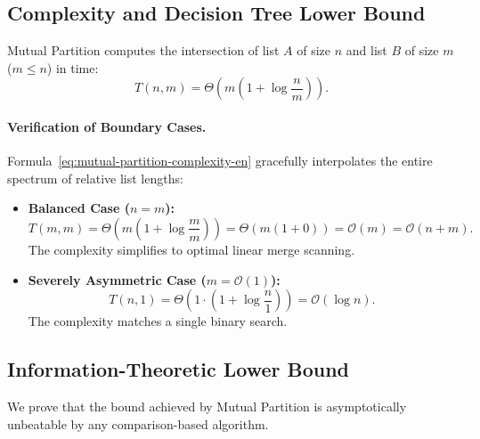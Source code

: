 \subsection{Complexity and Decision Tree Lower Bound}

\begin{theorem}
Mutual Partition computes the intersection of list $A$ of size $n$ and list $B$ of size $m$ ($m \le n$) in time:
\begin{equation}
  T(n, m) = \Theta\left(m \left(1 + \log \frac{n}{m}\right)\right).
  \label{eq:mutual-partition-complexity-en}
\end{equation}
\end{theorem}

\paragraph{Verification of Boundary Cases.}
Formula~\eqref{eq:mutual-partition-complexity-en} gracefully interpolates the entire spectrum of relative list lengths:
\begin{itemize}
  \item \textbf{Balanced Case ($n = m$):}
  \begin{equation}
    T(m, m) = \Theta\left(m \left(1 + \log \frac{m}{m}\right)\right) = \Theta(m (1 + 0)) = \mathcal{O}(m) = \mathcal{O}(n + m).
  \end{equation}
  The complexity simplifies to optimal linear merge scanning.
  \item \textbf{Severely Asymmetric Case ($m = \mathcal{O}(1)$):}
  \begin{equation}
    T(n, 1) = \Theta\left(1 \cdot \left(1 + \log \frac{n}{1}\right)\right) = \mathcal{O}(\log n).
  \end{equation}
  The complexity matches a single binary search.
\end{itemize}

\subsection{Information-Theoretic Lower Bound}
We prove that the bound achieved by Mutual Partition is asymptotically unbeatable by any comparison-based algorithm.

